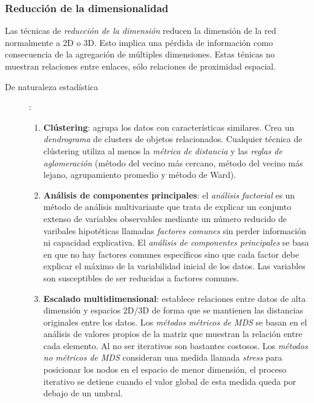 \documentclass[10pt,spanish, landscape, twocolumn]{article}
\begin{document}
\subsubsection{\textcolor{temacuatro}Reducción de la dimensionalidad}
Las técnicas de \textit{\textcolor{temacuatro}{reducción de la dimensión}} reducen la dimensión de la red normalmente a 2D o 3D. Esto implica una pérdida de información como consecuencia de la agregación de múltiples dimensiones. Estas ténicas no muestran relaciones entre enlaces, sólo relaciones de proximidad espacial.

\begin{description}
    \item[De naturaleza estadística]:

    \begin{enumerate}[\color{temacuatro}{$\heartsuit$}]
        \item \textbf{\textcolor{temacuatro}{Clústering}}: agrupa los datos con características similares. Crea un \textit{\textcolor{temacuatro}{dendrograma}} de clusters de objetos relacionados. Cualquier técnica de clústering utiliza al menos la \textit{\textcolor{temacuatro}{métrica de distancia}} y las \textit{\textcolor{temacuatro}{reglas de aglomeración}} (método del vecino más cercano, método del vecino más lejano, agrupamiento promedio y método de Ward).
        \item \textbf{\textcolor{temacuatro}{Análisis de componentes principales}}: el \textit{\textcolor{temacuatro}{análisis factorial}} es un método de análisis multivariante que trata de explicar un conjunto extenso de variables observables mediante un número reducido de varibales hipotéticas llamadas \textit{\textcolor{temacuatro}{factores comunes}} sin perder información ni capacidad explicativa. El \textit{\textcolor{temacuatro}{análisis de componentes principales}} se basa en que no hay factores comunes específicos sino que cada factor debe explicar el máximo de la variabilidad inicial de los datos. Las variables son susceptibles de ser reducidas a factores comunes.
        \item \textbf{\textcolor{temacuatro}{Escalado multidimensional}}: establece relaciones entre datos de alta dimensión y espacios 2D/3D de forma que se mantienen las distancias originales entre los datos. Los \textit{\textcolor{temacuatro}{métodos métricos de MDS}} se basan en el análisis de valores propios de la matriz que muestran la relación entre cada elemento. Al no ser iterativos son bastantes costosos. Los \textit{\textcolor{temacuatro}{métodos no métricos de MDS}} consideran una medida llamada \textit{\textcolor{temacuatro}{stress}} para posicionar los nodos en el espacio de menor dimensión, el proceso iterativo se detiene cuando el valor global de esta medida queda por debajo de un umbral.
    \end{enumerate}


\end{description}
\end{document}
